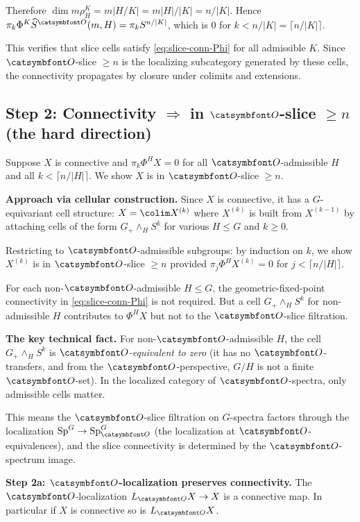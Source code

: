 Therefore $\dim m\rho_H^K = m|H/K| = m|H|/|K|=n/|K|$.  Hence $\pi_k\Phi^K\widehat S^\aO(m,H)=\pi_kS^{n/|K|}$, which is $0$ for $k<n/|K|=\lceil n/|K|\rceil$.

\medskip
This verifies that slice cells satisfy \eqref{eq:slice-conn-Phi} for all admissible $K$.  Since $\aO$-slice $\geq n$ is the localizing subcategory generated by these cells, the connectivity propagates by closure under colimits and extensions.

\subsection*{Step 2: Connectivity $\Rightarrow$ in $\aO$-slice $\geq n$ (the hard direction)}

Suppose $X$ is connective and $\pi_k\Phi^HX=0$ for all $\aO$-admissible $H$ and all $k<\lceil n/|H|\rceil$.  We show $X$ is in $\aO$-slice $\geq n$.

\medskip
\noindent\textbf{Approach via cellular construction.}  Since $X$ is connective, it has a $G$-equivariant cell structure: $X=\colim X^{(k)}$ where $X^{(k)}$ is built from $X^{(k-1)}$ by attaching cells of the form $G_+\wedge_H S^k$ for various $H\le G$ and $k\geq 0$.

Restricting to $\aO$-admissible subgroups: by induction on $k$, we show $X^{(k)}$ is in $\aO$-slice $\geq n$ provided $\pi_j\Phi^HX^{(k)}=0$ for $j<\lceil n/|H|\rceil$.

\medskip
For each non-$\aO$-admissible $H\le G$, the geometric-fixed-point connectivity in \eqref{eq:slice-conn-Phi} is not required.  But a cell $G_+\wedge_H S^k$ for non-admissible $H$ contributes to $\Phi^HX$ but not to the $\aO$-slice filtration.

\medskip
\noindent\textbf{The key technical fact.}  For non-$\aO$-admissible $H$, the cell $G_+\wedge_H S^k$ is \emph{$\aO$-equivalent to zero} (it has no $\aO$-transfers, and from the $\aO$-perspective, $G/H$ is not a finite $\aO$-set).  In the localized category of $\aO$-spectra, only admissible cells matter.

This means the $\aO$-slice filtration on $G$-spectra factors through the localization $\mathrm{Sp}^G\to\mathrm{Sp}^G_\aO$ (the localization at $\aO$-equivalences), and the slice connectivity is determined by the $\aO$-spectrum image.

\medskip
\noindent\textbf{Step 2a: $\aO$-localization preserves connectivity.}  The $\aO$-localization $L_\aO X\to X$ is a connective map.  In particular if $X$ is connective so is $L_\aO X$.


